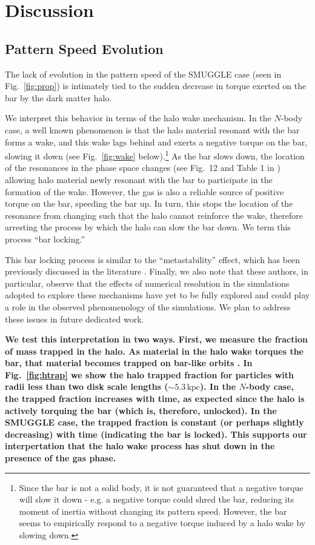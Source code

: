 \documentclass[twocolumn,linenumbers,trackchanges]{aastex631}
\newcommand{\Nbody}{$N$-body}
\newcommand{\SMUGGLE}{SMUGGLE}
\begin{document}
\section{Discussion}
\label{sec:discussion}
\subsection{Pattern Speed Evolution}
The lack of evolution in the pattern speed of the \SMUGGLE{} case (seen in
Fig.~\ref{fig:prop}) is intimately tied to the sudden decrease in torque exerted
on the bar by the dark matter halo. 

We interpret this behavior in terms of the halo wake mechanism. In the
\Nbody{} case, a well known phenomenon is that the halo material resonant with
the bar forms a wake, and this wake lags behind \citep{1984MNRAS.209..729T,
1985MNRAS.213..451W, 1992ApJ...400...80H} and exerts a negative torque on the
bar, slowing it down (see Fig.~\ref{fig:wake} below).\footnote{Since the bar is not a solid
body, it is not guaranteed that a negative torque will slow it down - e.g. a
negative torque could shred the bar, reducing its moment of inertia without
changing its pattern speed. However, the bar seems to empirically respond to a
negative torque induced by a halo wake by slowing down.} As the bar slows down,
the location of the resonances in the phase space changes (see Fig.~12 and Table
1 in \citet{2020ApJ...890..117D}) allowing halo material newly resonant with the
bar to participate in the formation of the wake. However, the gas is also a
reliable source of positive torque on the bar, speeding the bar up. In turn,
this stops the location of the resonance from changing such that the halo cannot
reinforce the wake, therefore arresting the process by which the halo can slow
the bar down. We term this process ``bar locking.''

This bar locking process is similar to the ``metastability'' effect, which has
been previously discussed in the literature \citep{2003MNRAS.345..406V,
2006ApJ...639..868S}. Finally, we also note that these authors, in particular,
observe that the effects of numerical resolution in the simulations adopted to
explore these mechanisms have yet to be fully explored and could play a role in
the observed phenomenology of the simulations. We plan to address these issues
in future dedicated work.

{\bf We test this interpretation in two ways. First, we measure the fraction of
mass trapped in the halo. As material in the halo wake torques the bar, that
material becomes trapped on bar-like orbits \citep[the ``shadow
bar'';][]{2016MNRAS.463.1952P}. In Fig.~\ref{fig:htrap} we show the halo trapped
fraction for particles with radii less than two disk scale lengths
($\sim5.3\,\textrm{kpc}$). In the \Nbody{} case, the trapped fraction increases
with time, as expected since the halo is actively torquing the bar (which is,
therefore, unlocked). In the \SMUGGLE{} case, the trapped fraction is constant
(or perhaps slightly decreasing) with time (indicating the bar is locked). This
supports our interpertation that the halo wake process has shut down in the
presence of the gas phase.}
\end{document}
